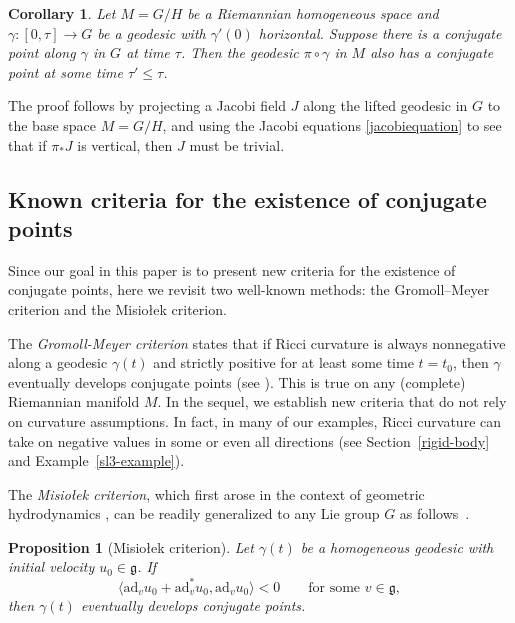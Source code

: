 \documentclass[oneside, 11pt]{amsart}
\newtheorem{proposition}[theorem]{Proposition}
\newtheorem{corollary}[theorem]{Corollary}
\numberwithin{equation}{section}
\newcommand{\ad}{\mathrm{ad}}
\newcommand{\g}{\mathfrak{g}}
\begin{document}
\begin{corollary}\label{homogeneousconjugatepointscor}
    Let $M=G/H$ be a Riemannian homogeneous space and  $\gamma\colon [0,\tau]\to G$ be a geodesic with $\gamma'(0)$ horizontal. Suppose there is a conjugate point along $\gamma$ in $G$ at time $\tau$. Then the geodesic $\pi\circ\gamma$ in $M$ also has a conjugate point at some time $\tau'\le \tau$. 
\end{corollary}

The proof follows by projecting a Jacobi field $J$ along the lifted geodesic in $G$ to the base space $M = G/H$, and using the Jacobi equations \ref{jacobiequation} to see that if $\pi_*J$ is vertical, then $J$ must be trivial.


\subsection{Known criteria for the existence of conjugate points}\label{sec:background-conjugate-criteria}


Since our goal in this paper is to present new criteria for the existence of conjugate points, here we revisit two well-known methods: the Gromoll–Meyer criterion and the Misio{\l}ek criterion.  

The \emph{Gromoll-Meyer criterion} states that if Ricci curvature is always nonnegative along a geodesic $\gamma(t)$ and strictly positive for at least some time $t = t_0$, then $\gamma$ eventually develops conjugate points (see \cite{GM}). This is true on any (complete) Riemannian manifold $M$. In the sequel, we establish new criteria that do not rely on curvature assumptions. In fact, in many of our examples, Ricci curvature can take on negative values in some or even all directions (see Section~\ref{rigid-body} and Example~\ref{sl3-example}).

The \emph{Misio{\l}ek criterion}, which first arose in the context of geometric hydrodynamics \cite{Benn, DMSY,M1,P1}, can be readily generalized to any Lie group $G$ as follows~\cite{tauchiyonedapositivity}.
\begin{proposition}[Misio{\l}ek criterion]
Let $\gamma(t)$ be a homogeneous geodesic with initial velocity $u_0\in\g$. If 
\begin{equation}\label{eq_m_curvature}
\big\langle\ad_vu_0 + \ad^*_vu_0, \ad_vu_0\big\rangle < 0 \qquad \text{for some $v\in\mathfrak{g}$},
\end{equation}
then $\gamma(t)$ eventually develops conjugate points. 
\end{proposition} 
\end{document}
